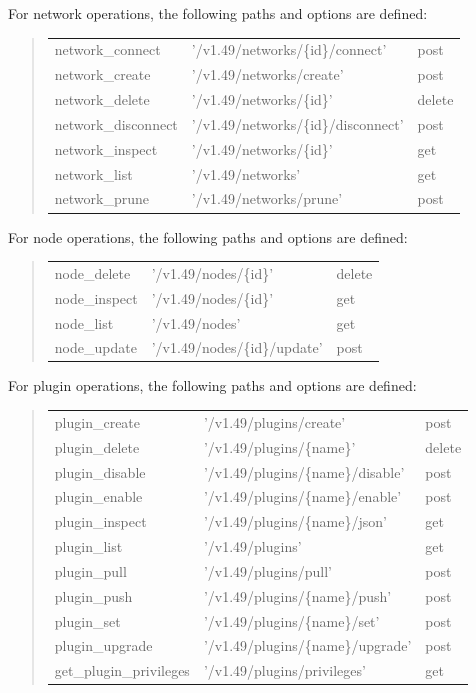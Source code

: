 \begin{description}
For network operations, the following paths and options are defined:

\begin{quote}
\begin{tabulary}{0.9\textwidth}{|l|L|l|}
\hline
network_connect & '/v1.49/networks/\{id\}/connect' & post \\
network_create & '/v1.49/networks/create' & post \\
network_delete & '/v1.49/networks/\{id\}' & delete \\
network_disconnect & '/v1.49/networks/\{id\}/disconnect' & post \\
network_inspect & '/v1.49/networks/\{id\}' & get \\
network_list & '/v1.49/networks' & get \\
network_prune & '/v1.49/networks/prune' & post \\
\hline
\end{tabulary}
\end{quote}

For node operations, the following paths and options are defined:

\begin{quote}
\begin{tabulary}{0.9\textwidth}{|l|L|l|}
\hline
node_delete & '/v1.49/nodes/\{id\}' & delete \\
node_inspect & '/v1.49/nodes/\{id\}' & get \\
node_list & '/v1.49/nodes' & get \\
node_update & '/v1.49/nodes/\{id\}/update' & post \\
\hline
\end{tabulary}
\end{quote}

For plugin operations, the following paths and options are defined:

\begin{quote}
\begin{tabulary}{0.9\textwidth}{|l|L|l|}
\hline
plugin_create & '/v1.49/plugins/create' & post \\
plugin_delete & '/v1.49/plugins/\{name\}' & delete \\
plugin_disable & '/v1.49/plugins/\{name\}/disable' & post \\
plugin_enable & '/v1.49/plugins/\{name\}/enable' & post \\
plugin_inspect & '/v1.49/plugins/\{name\}/json' & get \\
plugin_list & '/v1.49/plugins' & get \\
plugin_pull & '/v1.49/plugins/pull' & post \\
plugin_push & '/v1.49/plugins/\{name\}/push' & post \\
plugin_set & '/v1.49/plugins/\{name\}/set' & post \\
plugin_upgrade & '/v1.49/plugins/\{name\}/upgrade' & post \\
get_plugin_privileges & '/v1.49/plugins/privileges' & get \\
\hline
\end{tabulary}
\end{quote}


\end{description}
